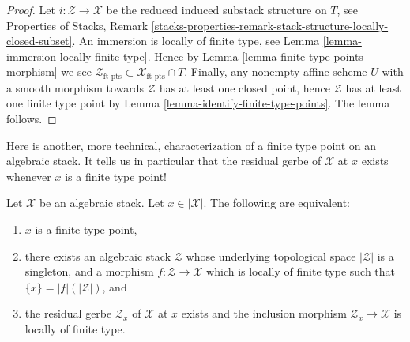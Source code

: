 \begin{proof}
Let $i : \mathcal{Z} \to \mathcal{X}$ be the reduced induced substack
structure on $T$, see
Properties of Stacks,
Remark \ref{stacks-properties-remark-stack-structure-locally-closed-subset}.
An immersion is locally of finite type, see
Lemma \ref{lemma-immersion-locally-finite-type}.
Hence by
Lemma \ref{lemma-finite-type-points-morphism}
we see
$\mathcal{Z}_{\text{ft-pts}} \subset \mathcal{X}_{\text{ft-pts}} \cap T$.
Finally, any nonempty affine scheme $U$ with a smooth morphism towards
$\mathcal{Z}$ has at least one closed point, hence $\mathcal{Z}$ has at least
one finite type point by
Lemma \ref{lemma-identify-finite-type-points}.
The lemma follows.
\end{proof}

\noindent
Here is another, more technical, characterization of a finite type
point on an algebraic stack. It tells us in particular that the residual
gerbe of $\mathcal{X}$ at $x$ exists whenever $x$ is a finite type point!

\begin{lemma}
\label{lemma-point-finite-type-monomorphism}
Let $\mathcal{X}$ be an algebraic stack.
Let $x \in |\mathcal{X}|$. The following are equivalent:
\begin{enumerate}
\item $x$ is a finite type point,
\item there exists an algebraic stack $\mathcal{Z}$
whose underlying topological space $|\mathcal{Z}|$ is a singleton,
and a morphism $f : \mathcal{Z} \to \mathcal{X}$ which is
locally of finite type such that $\{x\} = |f|(|\mathcal{Z}|)$, and
\item the residual gerbe $\mathcal{Z}_x$ of $\mathcal{X}$ at $x$ exists
and the inclusion morphism $\mathcal{Z}_x \to \mathcal{X}$ is locally of
finite type.
\end{enumerate}
\end{lemma}

